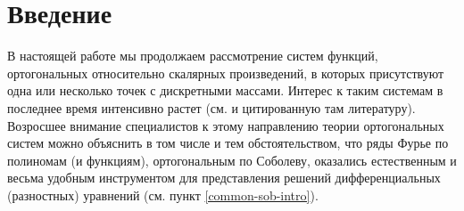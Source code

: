 \section{Введение}
В настоящей работе мы продолжаем рассмотрение систем функций, ортогональных относительно скалярных произведений, в которых присутствуют одна или несколько точек  с дискретными массами. Интерес к таким системам  в последнее время интенсивно растет  (см. \cite{sobleg-Shar2016, equ102-Shar20, sobleg-IserKoch, sobleg-MarcelAlfaroRezola, laplas-Meijer, sobleg-KwonLittl1, sobleg-Lopez1995, sobleg-KwonLittl2, laplas-MarcelXu, sobleg-Shar17, laplas-Shar13}  и цитированную там литературу). Возросшее  внимание специалистов  к этому направлению теории ортогональных систем можно объяснить в том числе и тем обстоятельством, что ряды Фурье по полиномам (и функциям), ортогональным по Соболеву, оказались естественным и весьма удобным инструментом для представления решений  дифференциальных (разностных) уравнений (см. пункт \ref{common-sob-intro}). 
